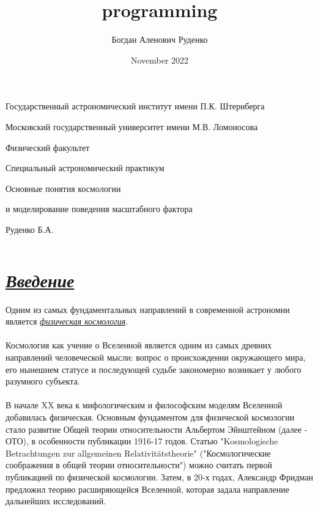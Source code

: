 \documentclass{article}
\title{programming}
\author{Богдан Аленович Руденко}
\date{November 2022}
\newcommand{\sus}[1]{\addcontentsline{toc}{section}{ \small #1}}
\newcommand{\ttt}[1]{\underline{\textit{#1}}}
\begin{document}
\begin{titlepage}
\centerline{Государственный астрономический институт имени П.К. Штернберга}
\centerline{Московский государственный университет имени М.В. Ломоносова}
\centerline{Физический факультет}
\vspace{6cm}
\vspace{2cm}
\centerline{\huge Специальный астрономический практикум}
\vspace{2cm}
\centerline{\huge Основные понятия космологии}
\vspace{0.5cm}
\centerline{\huge и моделирование поведения масштабного фактора}
\vspace{9cm}

\begin{flushright}
Руденко Б.А.\\
\vspace{0.5cm}

\end{flushright}
$$\text{}$$

\tableofcontents
\thispagestyle{empty}
\end{titlepage}
\newpage

\pagestyle{fancy}
\fancyhf{}
\cfoot{\thepage}
\renewcommand{\headrulewidth}{0.4pt}


\sus{Введение}
\section*{\ttt{Введение}}

Одним из самых фундаментальных направлений в современной астрономии является \ttt{физическая космология}.\\\\
Космология как учение о Вселенной является одним из самых древних направлений человеческой мысли: вопрос
о происхождении окружающего мира, его нынешнем статусе и последующей судьбе закономерно возникает у 
любого разумного субъекта.\\\\В начале XX века к мифологическим и философским моделям Вселенной добавилась
физическая. Основным фундаментом для физической космологии стало развитие Общей теории относительности
Альбертом Эйнштейном (далее - ОТО), в особенности публикации 1916-17 годов. Статью
"Kosmologische Betrachtungen zur allgemeinen Relativitätstheorie" 
("Космологические соображения в общей теории относительности") можно считать первой публикацией
по физической космологии. Затем, в 20-х годах, Александр Фридман предложил теорию расширяющейся
Вселенной, которая задала направление дальнейших исследований. 
\end{document}
